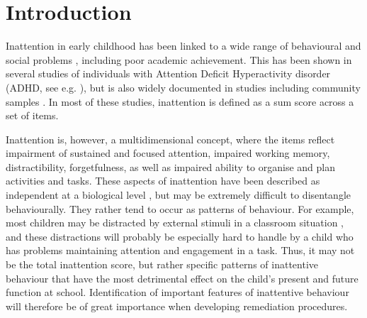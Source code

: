 \documentclass[10pt,letterpaper]{article}
\begin{document}

\linenumbers

\section*{Introduction}
Inattention in early childhood has been linked to a wide range of behavioural and social problems \cite{Bellanti2000, Connors2012},  including poor academic achievement. This has been shown in several studies of individuals with Attention Deficit Hyperactivity disorder 
(ADHD, see e.g. \cite{Lee2006, Owens2017}), but is also widely documented in studies including community samples \cite{Polderman2010, Metcalfe2013, Pingault2014, Garner2013, Holmberg2014, Gray2014, Salla2016}.  In most of these studies, inattention is defined as a sum score across a set of items.

Inattention is, however, a multidimensional concept,  where the items 
reflect impairment of sustained and focused attention, impaired working memory, distractibility, forgetfulness, as well as impaired ability to organise and plan activities and tasks. These aspects of inattention have been described as independent at a biological level  \cite{Berry2014}, but may be extremely difficult to disentangle behaviourally. They rather tend to occur as patterns of behaviour. For example, most children may be distracted by external stimuli in a classroom situation \cite{Rescorla2007}, and these distractions will probably be especially hard to handle by a child who has problems maintaining attention and engagement in a task. Thus, it may not be the total inattention score, but rather specific patterns of inattentive behaviour that have the most detrimental effect on the child's present and future function at school. Identification of important features of inattentive behaviour will therefore be of great importance when developing remediation procedures. 
\end{document}

